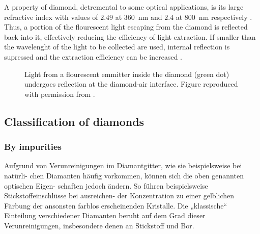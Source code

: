   A property of diamond, detremental to some optical applications, is its large refractive index with values of $2.49$ at \SI{360}{\nm} and $2.4$ at \SI{800}{\nm} respectively \cite{steinmetz::58}. Thus, a portion of the flourescent light escaping from the diamond is reflected back into it, effectively reducing the efficiency of light extraction. If \nds smaller than the wavelenght of the light to be collected are used, internal reflection is supressed and the extraction efficiency can be increased \cite{neu::49}.

  \begin{figure}[htp]
		\centering
		\caption{Light from a flourescent emmitter inside the diamond (green dot) undergoes reflection at the diamond-air interface. Figure reproduced with permission from \cite{neu::thesis}.}
		\label{fig::diamond_refraction}
	\end{figure}

  \subsection{Classification of diamonds}

    \subsubsection{By impurities}

      Aufgrund von Verunreinigungen im Diamantgitter, wie sie beispielsweise bei natürli- chen Diamanten häufig vorkommen, können sich die oben genannten optischen Eigen-
      schaften jedoch ändern. So führen beispielsweise Stickstoffeinschlüsse bei ausreichen- der Konzentration zu einer gelblichen Färbung der ansonsten farblos erscheinenden Kristalle. Die „klassische“ Einteilung verschiedener Diamanten beruht auf dem Grad dieser Verunreinigungen, insbesondere denen an Stickstoff und Bor.

